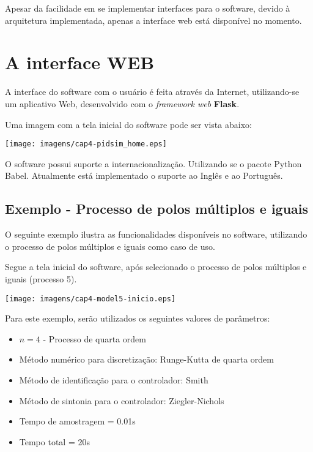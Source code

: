             Apesar da facilidade em se implementar interfaces para o software, devido à arquitetura
            implementada, apenas a interface web está disponível no momento.

\section{A interface WEB}

    A interface do software com o usuário é feita através da Internet, utilizando-se um aplicativo Web,
    desenvolvido com o \textit{framework web} \textbf{Flask}.

    Uma imagem com a tela inicial do software pode ser vista abaixo:
    
    \begin{center}
        \texttt{[image: imagens/cap4-pidsim\_home.eps]}
    \end{center}

    O software possui suporte a internacionalização. Utilizando se o pacote Python Babel. Atualmente está
    implementado o suporte ao Inglês e ao Português.
    
    \subsection{Exemplo - Processo de polos múltiplos e iguais}
    
        O seguinte exemplo ilustra as funcionalidades disponíveis no software,
        utilizando o processo de polos múltiplos e iguais como caso de uso.
        
        Segue a tela inicial do software, após selecionado o processo de
        polos múltiplos e iguais (processo 5).
        
        \begin{center}
            \texttt{[image: imagens/cap4-model5-inicio.eps]}
        \end{center}
        
        Para este exemplo, serão utilizados os seguintes valores de parâmetros:
        
        \begin{itemize}
            \item $n = 4$ - Processo de quarta ordem
            \item Método numérico para discretização: Runge-Kutta de quarta ordem
            \item Método de identificação para o controlador: Smith
            \item Método de sintonia para o controlador: Ziegler-Nichols
            \item Tempo de amostragem = 0.01s
            \item Tempo total = 20s
        \end{itemize}
        
